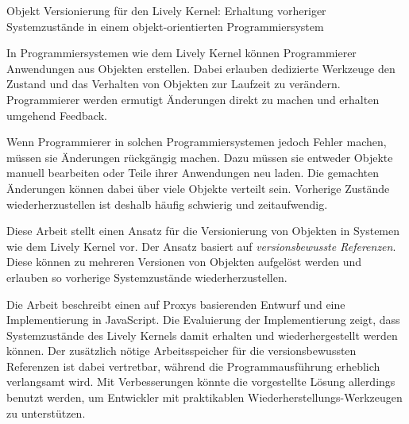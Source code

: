 \begin{zusammenfassung}

{\Large Objekt Versionierung für den Lively Kernel: Erhaltung vorheriger Systemzustände in einem objekt-orientierten Programmiersystem}

In Programmiersystemen wie dem Lively Kernel können Programmierer Anwendungen aus Objekten erstellen.
Dabei erlauben dedizierte Werkzeuge den Zustand und das Verhalten von Objekten zur Laufzeit zu verändern.
Programmierer werden ermutigt Änderungen direkt zu machen und erhalten umgehend Feedback.

Wenn Programmierer in solchen Programmiersystemen jedoch Fehler machen, müssen sie Änderungen rückgängig machen.
Dazu müssen sie entweder Objekte manuell bearbeiten oder Teile ihrer Anwendungen neu laden.
Die gemachten Änderungen können dabei über viele Objekte verteilt sein.
Vorherige Zustände wiederherzustellen ist deshalb häufig schwierig und zeitaufwendig.

Diese Arbeit stellt einen Ansatz für die Versionierung von Objekten in Systemen wie dem Lively Kernel vor.
Der Ansatz basiert auf \emph{versionsbewusste Referenzen}.
Diese können zu mehreren Versionen von Objekten aufgelöst werden und erlauben so vorherige Systemzustände wiederherzustellen.

Die Arbeit beschreibt einen auf Proxys basierenden Entwurf und eine Implementierung in JavaScript.
Die Evaluierung der Implementierung zeigt, dass Systemzustände des Lively Kernels damit erhalten und wiederhergestellt werden können.
Der zusätzlich nötige Arbeitsspeicher für die versionsbewussten Referenzen ist dabei vertretbar, während die Programmausführung erheblich verlangsamt wird.
Mit Verbesserungen könnte die vorgestellte Lösung allerdings benutzt werden, um Entwickler mit praktikablen Wiederherstellungs-Werkzeugen zu unterstützen.

\end{zusammenfassung}

